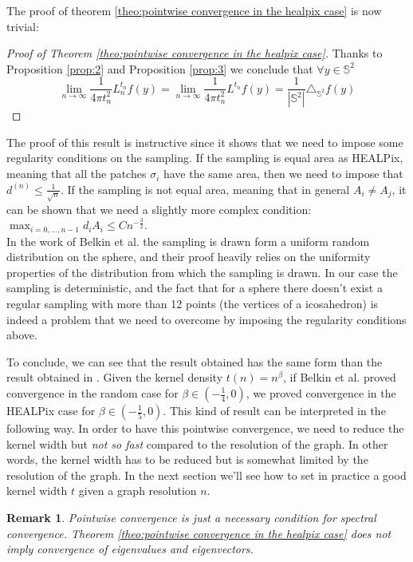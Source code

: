 \documentclass{article} %
\newtheorem*{remark}{Remark}
\begin{document}
The proof of theorem \ref{theo:pointwise convergence in the healpix case} is now trivial:
\begin{proof}[Proof of Theorem \ref{theo:pointwise convergence in the healpix case}]
	Thanks to Proposition \ref{prop:2} and Proposition \ref{prop:3}	we conclude that $\forall y\in\mathbb S^2 $
	$$\lim_{n\to\infty}\frac{1}{4\pi t_n^2} L_n^{t_n}f(y) =  \lim_{n\to\infty}\frac{1}{4\pi t_n^2} L^{t_n}f(y) = \frac{1}{|\mathbb S^2|}\triangle_{\mathbb S^2}f(y) $$
\end{proof}

The proof of this result is instructive since it shows that we need to impose some regularity conditions on the sampling. If the sampling is equal area as HEALPix, meaning that all the patches $\sigma_i$ have the same area, then we need to impose that $ d^{(n)}\leq \frac{1}{\sqrt{n}}$. If the sampling is not equal area, meaning that in general $A_i\neq A_j$, it can be shown that we need a slightly more complex condition: $\max_{i=0,\dots,n-1}d_iA_i\leq Cn^{-\frac{3}{2}}$.\\
In the work of Belkin et al. \cite{Belkin:2005:TTF:2138147.2138189} the sampling is drawn form a uniform random distribution on the sphere, and their proof heavily relies on the uniformity properties of the distribution from which the sampling is drawn. In our case the sampling is deterministic, and the fact that for a sphere there doesn't exist a regular sampling with more than 12 points (the vertices of a icosahedron) is indeed a problem that we need to overcome by imposing the regularity conditions above.

To conclude, we can see that the result obtained has the same form than the result obtained in \cite{Belkin:2005:TTF:2138147.2138189}. Given the kernel density $t(n)=n^\beta$, if Belkin et al. proved convergence in the random case for $\beta \in (-\frac{1}{4}, 0)$, we proved convergence in the HEALPix case for $\beta \in (-\frac{1}{5}, 0)$. This kind of result can be interpreted in the following way. In order to have this pointwise convergence, we need to reduce the kernel width but \textit{not so fast} compared to the resolution of the graph. In other words, the kernel width has to be reduced but is somewhat limited by the resolution of the graph. In the next section we'll see how to set in practice a good kernel width $t$ given a graph resolution $n$.
\begin{remark}
	Pointwise convergence is just a necessary condition for spectral convergence.  Theorem \ref{theo:pointwise convergence in the healpix case} does not imply convergence of eigenvalues and eigenvectors.
\end{remark}
\end{document}
